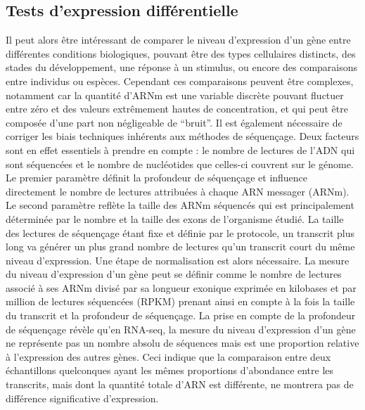 \subsection{Tests d’expression différentielle}
\label{subsec:expression-différentielle}

Il peut alors être intéressant de comparer le niveau d’expression d’un gène entre différentes \glspl{condition} biologiques, pouvant être des types cellulaires distincts, des stades du développement, une réponse à un stimulus, ou encore des comparaisons entre individus ou espèces. Cependant ces comparaisons peuvent être complexes, notamment car la quantité d’\acrshort{ARNm} est une variable discrète pouvant fluctuer entre zéro et des valeurs extrêmement hautes de concentration, et qui peut être composée d’une part non négligeable de “bruit”. Il est également nécessaire de corriger les biais techniques inhérents aux méthodes de séquençage. Deux facteurs sont en effet essentiels à prendre en compte : le nombre de lectures de l’\acrshort{ADN} qui sont séquencées et le nombre de nucléotides que celles-ci couvrent sur le génome. Le premier paramètre définit la profondeur de séquençage et influence directement le nombre de lectures attribuées à chaque \acrshort{ARN} messager (\acrshort{ARNm}). Le second paramètre reflète la taille des \acrshort{ARNm} séquencés qui est principalement déterminée par le nombre et la taille des exons de l’organisme étudié. La taille des lectures de séquençage étant fixe et définie par le protocole, un transcrit plus long va générer un plus grand nombre de lectures qu’un transcrit court du même niveau d’expression. Une étape de normalisation est alors nécessaire. La mesure du niveau d’expression d’un gène peut se définir comme le nombre de lectures associé à ses \acrshort{ARNm} divisé par sa longueur exonique exprimée en kilobases et par million de lectures séquencées (\acrshort{RPKM}) prenant ainsi en compte à la fois la taille du transcrit et la profondeur de séquençage. La prise en compte de la profondeur de séquençage révèle qu’en \acrshort{RNA-seq}, la mesure du niveau d’expression d’un gène ne représente pas un nombre absolu de séquences mais est une proportion relative à l’expression des autres gènes. Ceci indique que la comparaison entre deux échantillons quelconques ayant les mêmes proportions d’abondance entre les transcrits, mais dont la quantité totale d’\acrshort{ARN} est différente, ne montrera pas de différence significative d’expression. \\

